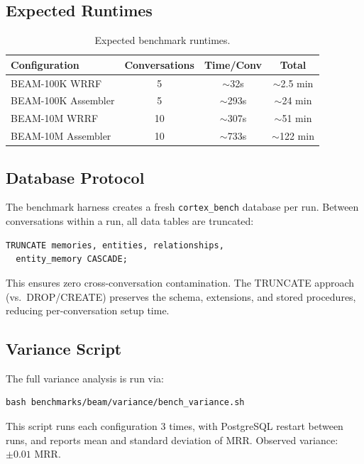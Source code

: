 \documentclass[11pt]{article}
\begin{document}
\subsection{Expected Runtimes}

\begin{table}[h]
\centering
\caption{Expected benchmark runtimes.}
\label{tab:runtimes}
\begin{tabular}{lccc}
\toprule
Configuration & Conversations & Time/Conv & Total \\
\midrule
BEAM-100K WRRF & 5 & $\sim$32s & $\sim$2.5 min \\
BEAM-100K Assembler & 5 & $\sim$293s & $\sim$24 min \\
BEAM-10M WRRF & 10 & $\sim$307s & $\sim$51 min \\
BEAM-10M Assembler & 10 & $\sim$733s & $\sim$122 min \\
\bottomrule
\end{tabular}
\end{table}

\subsection{Database Protocol}

The benchmark harness creates a fresh \texttt{cortex\_bench} database
per run.  Between conversations within a run, all data tables are
truncated:

\begin{verbatim}
TRUNCATE memories, entities, relationships,
  entity_memory CASCADE;
\end{verbatim}

This ensures zero cross-conversation contamination.  The TRUNCATE
approach (vs.\ DROP/CREATE) preserves the schema, extensions, and
stored procedures, reducing per-conversation setup time.

\subsection{Variance Script}

The full variance analysis is run via:

\begin{verbatim}
bash benchmarks/beam/variance/bench_variance.sh
\end{verbatim}

This script runs each configuration 3 times, with PostgreSQL restart
between runs, and reports mean and standard deviation of MRR.
Observed variance: $\pm 0.01$ MRR.
\end{document}
